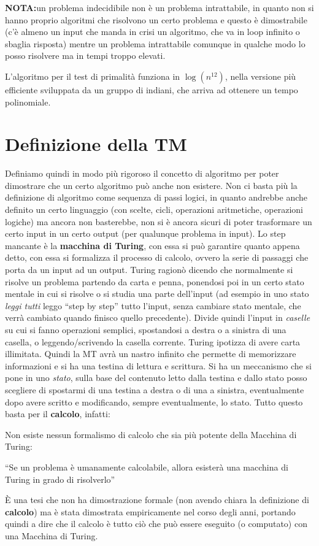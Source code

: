 \textbf{NOTA:}un problema indecidibile non è un problema intrattabile, in quanto non
si hanno proprio algoritmi che risolvono un certo problema e questo è
dimostrabile (c'è almeno un input che manda in crisi un algoritmo, che va in
loop infinito o sbaglia risposta) mentre un problema intrattabile comunque in
qualche modo lo posso risolvere ma in tempi troppo elevati.
\begin{shaded}
  L'algoritmo per il test di primalità funziona in $\log (n^{12})$, nella
  versione più efficiente sviluppata da un gruppo di indiani, che arriva ad
  ottenere un tempo polinomiale.
\end{shaded}
\section{Definizione della TM}
Definiamo quindi in modo più rigoroso il concetto di algoritmo per poter
dimostrare che un certo algoritmo può anche non esistere. Non ci basta più la
definizione di algoritmo come sequenza di passi logici, in quanto andrebbe anche
definito un certo linguaggio (con scelte, cicli, operazioni aritmetiche,
operazioni logiche) ma ancora non basterebbe, non si è ancora sicuri di poter
trasformare un certo input in un certo output (per qualunque problema in
input). Lo step mancante è la \textbf{macchina di Turing}, con essa si può
garantire quanto appena detto, con essa si formalizza il processo di calcolo,
ovvero la serie di passaggi che porta da un input ad un output. Turing ragionò
dicendo che normalmente si risolve un problema partendo da carta e penna,
ponendosi poi in un certo stato mentale in cui si risolve o si studia una parte
dell'input (ad esempio in uno stato \textit{leggi tutti} leggo ``step by step''
tutto l'input, senza cambiare stato mentale, che verrà cambiato quando finisco
quello precedente). Divide quindi l'input in \textit{caselle} su cui si fanno
operazioni semplici, spostandosi a destra o a sinistra di una casella, o
leggendo/scrivendo la casella corrente. Turing ipotizza di avere carta
illimitata. Quindi la MT avrà un nastro infinito che permette di memorizzare
informazioni e si ha una testina di lettura e scrittura. Si ha un meccanismo che
si pone in uno \textit{stato}, sulla base del contenuto letto dalla testina e
dallo stato posso scegliere di spostarmi di una testina a destra o di una a
sinistra, eventualmente dopo avere scritto e modificando, sempre eventualmente,
lo stato. Tutto questo basta per il \textbf{calcolo}, infatti:
\begin{definizione}
  Non esiste nessun formalismo di calcolo che sia più
  potente della Macchina di Turing:
  \begin{center}
   ``Se un problema è umanamente calcolabile, allora esisterà una macchina di
    Turing in grado di risolverlo''
  \end{center}
  È una tesi che non ha dimostrazione formale (non avendo chiara la definizione
  di \textbf{calcolo}) ma è stata dimostrata
  empiricamente nel corso degli anni, portando quindi a dire che il calcolo è tutto
  ciò che può essere eseguito (o computato) con una Macchina di Turing.\\
  
\end{definizione}
